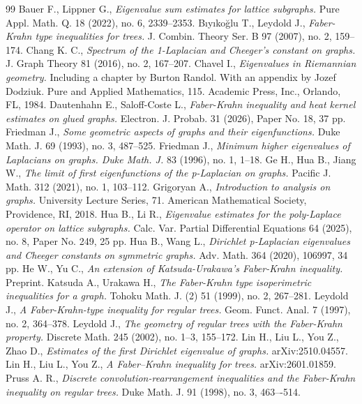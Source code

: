\documentclass[12pt]{amsart}
\theoremstyle{definition}
\theoremstyle{remark}
\numberwithin{equation}{section}
\begin{document}
\begin{thebibliography}{99}
Bauer F., Lippner G., {\sl Eigenvalue sum estimates for lattice subgraphs.} Pure Appl. Math. Q. 18 (2022), no. 6, 2339--2353.
Bıyıkoğlu T., Leydold J., {\sl Faber-Krahn type inequalities for trees.} J. Combin. Theory Ser. B 97 (2007), no. 2, 159--174.
Chang K. C., {\sl Spectrum of the 1-Laplacian and Cheeger's constant on graphs.} J. Graph Theory 81 (2016), no. 2, 167--207.
Chavel I., {\sl Eigenvalues in Riemannian geometry.} Including a chapter by Burton Randol. With an appendix by Jozef Dodziuk. Pure and Applied Mathematics, 115. Academic Press, Inc., Orlando, FL, 1984.
Dautenhahn E., Saloff-Coste L., {\sl Faber-Krahn inequality and heat kernel estimates on glued graphs.} Electron. J. Probab. 31 (2026), Paper No. 18, 37 pp.
Friedman J., {\sl Some geometric aspects of graphs and their eigenfunctions.} Duke Math. J. 69 (1993), no. 3, 487--525.
Friedman J., {\sl Minimum higher eigenvalues of Laplacians on graphs. Duke Math. J.} 83 (1996), no. 1, 1--18.
Ge H., Hua B., Jiang W., {\sl The limit of first eigenfunctions of the p-Laplacian on graphs.} Pacific J. Math. 312 (2021), no. 1, 103--112. 
Grigoryan A., {\sl Introduction to analysis on graphs.} University Lecture Series, 71. American Mathematical Society, Providence, RI, 2018.
Hua B., Li R., {\sl Eigenvalue estimates for the poly-Laplace operator on lattice subgraphs.} Calc. Var. Partial Differential Equations 64 (2025), no. 8, Paper No. 249, 25 pp.
Hua B., Wang L., {\sl Dirichlet p-Laplacian eigenvalues and Cheeger constants on symmetric graphs.} Adv. Math. 364 (2020), 106997, 34 pp.
He W., Yu C., {\sl An extension of Katsuda-Urakawa's Faber-Krahn inequality.} Preprint.
Katsuda A., Urakawa H., {\sl The Faber-Krahn type isoperimetric inequalities for a graph.} Tohoku Math. J. (2) 51 (1999), no. 2, 267--281.
Leydold J., {\sl A Faber-Krahn-type inequality for regular trees.} Geom. Funct. Anal. 7 (1997), no. 2, 364--378.
Leydold J., {\sl The geometry of regular trees with the Faber-Krahn property.} Discrete Math. 245 (2002), no. 1--3, 155--172.
Lin H., Liu L., You Z., Zhao D., {\sl Estimates of the first Dirichlet eigenvalue of graphs.}  arXiv:2510.04557.
Lin H., Liu L., You Z., {\sl A Faber–Krahn inequality for trees.} arXiv:2601.01859.
Pruss A. R., {\sl Discrete convolution-rearrangement inequalities and the Faber-Krahn inequality on regular trees.} Duke Math. J. 91 (1998), no. 3, 463–-514.

\end{thebibliography}
\end{document}
